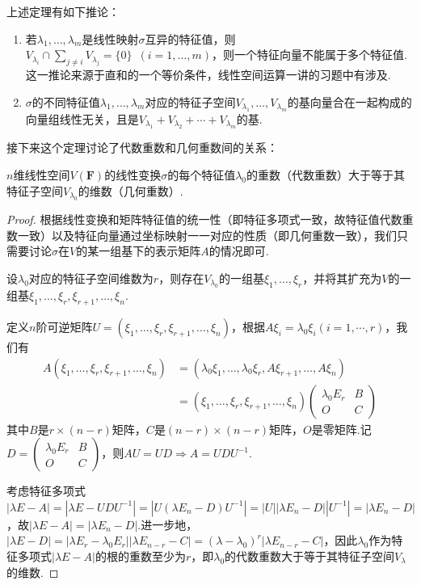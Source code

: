 上述定理有如下推论：
\begin{enumerate}
    \item 若$\lambda_1,\ldots,\lambda_m$是线性映射$\sigma$互异的特征值，则$V_{\lambda_i}\cap\sum\limits_{j\neq i}V_{\lambda_j}=\{0\}
              \enspace(i=1,\ldots,m)$，则一个特征向量不能属于多个特征值. 这一推论来源于直和的一个等价条件，线性空间运算一讲的习题中有涉及.

    \item $\sigma$的不同特征值$\lambda_1,\ldots,\lambda_m$对应的特征子空间$V_{\lambda_1},\ldots,V_{\lambda_m}$的基向量合在一起构成的向量组线性无关，且是$V_{\lambda_1}+V_{\lambda_2}+\cdots+V_{\lambda_m}$的基.
\end{enumerate}

接下来这个定理讨论了代数重数和几何重数间的关系：
\begin{theorem}\label{thm:18:代数重数与几何重数}
    $n$维线性空间$V(\mathbf{F})$的线性变换$\sigma$的每个特征值$\lambda_0$的重数（代数重数）大于等于其特征子空间$V_{\lambda_0}$的维数（几何重数）.
\end{theorem}

\begin{proof}
    根据线性变换和矩阵特征值的统一性（即特征多项式一致，故特征值代数重数一致）以及特征向量通过坐标映射一一对应的性质（即几何重数一致），我们只需要讨论$\sigma$在$V$的某一组基下的表示矩阵$A$的情况即可.

    设$\lambda_0$对应的特征子空间维数为$r$，则存在$V_{\lambda_0}$的一组基$\xi_1,\ldots,\xi_r$，并将其扩充为$V$的一组基$\xi_1,\ldots,\xi_r,\xi_{r+1},\ldots,\xi_n$.

    定义$n$阶可逆矩阵$U=(\xi_1,\ldots,\xi_r,\xi_{r+1},\ldots,\xi_n)$，根据$A\xi_i=\lambda_0\xi_i(i=1,\cdots,r)$，我们有
    \begin{align*}
        A(\xi_1,\ldots,\xi_r,\xi_{r+1},\ldots,\xi_n) &= (\lambda_0\xi_1,\ldots,\lambda_0\xi_r,A\xi_{r+1},\ldots,A\xi_n) \\
        &= (\xi_1,\ldots,\xi_r,\xi_{r+1},\ldots,\xi_n)\begin{pmatrix}
            \lambda_0 E_r & B \\ O & C
        \end{pmatrix}
    \end{align*}
    其中$B$是$r\times(n-r)$矩阵，$C$是$(n-r)\times(n-r)$矩阵，$O$是零矩阵.记$D=\begin{pmatrix}
        \lambda_0 E_r & B \\ O & C
    \end{pmatrix}$，则$AU=UD\Rightarrow A=UDU^{-1}$.

    考虑特征多项式$|\lambda E-A|=|\lambda E-UDU^{-1}|=|U(\lambda E_n-D)U^{-1}|=|U||\lambda E_n-D||U^{-1}|=|\lambda E_n-D|$，故$|\lambda E-A|=|\lambda E_n-D|$.进一步地，$|\lambda E-D|=|\lambda E_r-\lambda_0 E_r||\lambda E_{n-r}-C|=(\lambda-\lambda_0)^r|\lambda E_{n-r}-C|$，因此$\lambda_0$作为特征多项式$|\lambda E-A|$的根的重数至少为$r$，即$\lambda_0$的代数重数大于等于其特征子空间$V_{\lambda}$的维数.
\end{proof}

